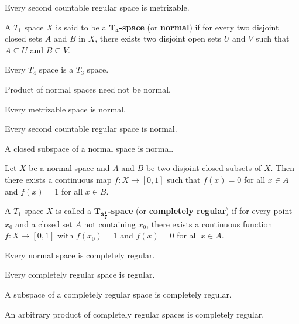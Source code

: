 \begin{thm}
    Every second countable regular space is metrizable.
\end{thm}

\begin{defn}
    A $T_1$ space $X$ is said to be a \textbf{$\bm{T_4}$-space} (or \textbf{normal}) if for every two disjoint closed sets $A$ and $B$ in $X$, there exists two disjoint open sets $U$ and $V$ such that $A \subseteq U$ and $B \subseteq V$.
\end{defn}

\begin{defn}
    Every $T_4$ space is a $T_3$ space.
\end{defn}

\begin{note}
    Product of normal spaces need not be normal.
\end{note}

\begin{thm}
    Every metrizable space is normal.
\end{thm}

\begin{thm}
    Every second countable regular space is normal.
\end{thm}

\begin{thm}
    A closed subspace of a normal space is normal.
\end{thm}

\begin{thm}
    Let $X$ be a normal space and $A$ and $B$ be two disjoint closed subsets of $X$. Then there exists a continuous map $f: X \to [0,1]$ such that $f(x) = 0$ for all $x \in A$ and $f(x) = 1$ for all $x \in B$.
\end{thm}

\begin{defn}
    A $T_1$ space $X$ is called a \textbf{$\bm{T_{3 \frac{1}{2}}}$-space} (or \textbf{completely regular}) if for every point $x_0$ and a closed set $A$ not containing $x_0$, there exists a continuous function $f: X \to [0,1]$ with $f(x_0) = 1$ and $f(x) = 0$ for all $x \in A$.
\end{defn}

\begin{note}
    Every normal space is completely regular.
\end{note}

\begin{note}
    Every completely regular space is regular.
\end{note}

\begin{thm}
    A subspace of a completely regular space is completely regular.
\end{thm}

\begin{thm}
    An arbitrary product of completely regular spaces is completely regular.
\end{thm}

\hhrule
